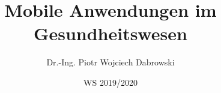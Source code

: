 \usepackage[utf8]{inputenc}
\usepackage[T1]{fontenc}


\title{Mobile Anwendungen im Gesundheitswesen}
\date{WS 2019/2020}
\author[PWD]{Dr.-Ing. Piotr Wojciech Dabrowski}

\usepackage{HTWBeamerTemplate/beamerthemeHTW}